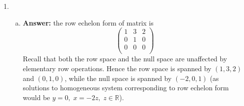 \documentclass[8pt]{article} %
\begin{document}
\begin{enumerate}[1]
	\item \begin{enumerate}[(a)]
	\item {\bf Answer: }the row echelon form of matrix is
			\[\left(\begin{array}{rrr}
			1&3&2\\
			0&1&0\\
			0&0&0\\
			\end{array}\right)
			\]
			Recall that both the row space and the null space are unaffected by elementary row operations.
			Hence the row space is spanned by $(1,3,2)$ and $(0,1,0)$, while the null space is spanned by $(-2,0,1)$ (as solutions
			to homogeneous system corresponding to row echelon form would be $y=0,\;x=-2z,\;z\in\mathbb{R}$). 
			

\end{enumerate}
\end{enumerate}
\end{document}
